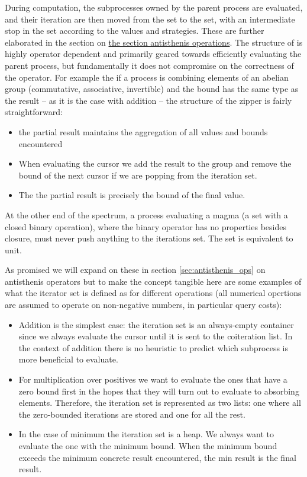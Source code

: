 During computation, the subprocesses owned by the parent process are
evaluated, and their iteration are then moved from the 
set to the  set, with an intermediate stop in the
 set according to the values and strategies. These
are further elaborated in the section on \hyperref[sec:antisthenis_ops]{the
  section antisthenis operations}. The structure of  is highly operator dependent and primarily geared towards
efficiently evaluating the parent process, but fundamentally it does
not compromise on the correctness of the operator. For example the if
a process is combining elements of an abelian group (commutative,
associative, invertible) and the bound has the same type as the result
-- as it is the case with addition -- the structure of the zipper is
fairly straightforward:

\begin{itemize}
\item the partial result maintains the aggregation of all values and
  bounds encountered
\item When evaluating the cursor we add the result to the group and
  remove the bound of the next cursor if we are popping from the
  iteration set.
\item The the partial result is precisely the bound of the final
  value.
\end{itemize}



At the other end of the spectrum, a process evaluating a magma (a set
with a closed binary operation), where the binary operator has no
properties besides closure, must never push anything to the iterations
set. The set is equivalent to unit.

As promised we will expand on these in section
\ref{sec:antisthenis_ops} on antisthenis operators but to make the
concept tangible here are some examples of what the iterator set is
defined as for different operations (all numerical opertions are
assumed to operate on non-negative numbers, in particular query
costs):

\begin{itemize}
\item Addition is the simplest case: the iteration set is an
  always-empty container since we always evaluate the cursor until it
  is sent to the coiteration list. In the context of addition there is
  no heuristic to predict which subprocess is more beneficial to
  evaluate.
\item For multiplication over positives we want to evaluate the ones
  that have a zero bound first in the hopes that they will turn out to
  evaluate to absorbing elements. Therefore, the iteration set is
  represented as two lists: one where all the zero-bounded iterations
  are stored and one for all the rest.
\item In the case of minimum the iteration set is a heap. We always
  want to evaluate the one with the minimum bound. When the minimum
  bound exceeds the minimum concrete result encountered, the min
  result is the final result.
\end{itemize}

